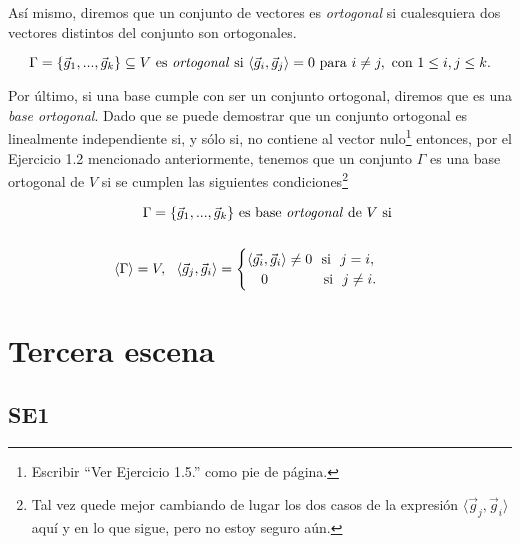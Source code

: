 \documentclass[12pt,dvipsnames]{article}
\numberwithin{equation}{section}
\begin{document}
\noindent Así mismo, diremos que un conjunto de vectores es \emph{ortogonal} si cualesquiera dos vectores distintos del conjunto son ortogonales.

\[
    \Gamma=\{\vec{g}_1,...,\vec{g}_k\}\subseteq V \ \text{es \emph{ortogonal} si} \ \langle \vec{g}_i , \vec{g}_j \rangle = 0 \ \text{para} \ i\neq j, \ \text{con} \ 1\le i,j\le k.
\]

\noindent Por último, si una base cumple con ser un conjunto ortogonal, diremos que es una \emph{base ortogonal}. Dado que se puede demostrar que un conjunto ortogonal es linealmente independiente si, y sólo si, no contiene al vector nulo\footnote{Escribir ``Ver Ejercicio 1.5.'' como pie de página.} entonces, por el Ejercicio 1.2 mencionado anteriormente, tenemos que un conjunto $\Gamma$ es una base ortogonal de $V$ si se cumplen las siguientes condiciones\footnote{Tal vez quede mejor cambiando de lugar los dos casos de la expresión $\langle \vec{g}_j , \vec{g}_i \rangle$ aquí y en lo que sigue, pero no estoy seguro aún.}

\begin{align*}
    \Gamma=\{\vec{g}_1,...,\vec{g}_k\} \text{ es base \emph{ortogonal} de } V \text{ si}& & &\\
    \\
    \langle\Gamma\rangle = V, \ \ \langle \vec{g}_j , \vec{g}_i \rangle = \begin{cases} \langle\vec{g_i}, \vec{g}_i\rangle\neq0 \ \ \text{si} \ \ j = i, \\ \quad 0 \quad \ \ \ \ \ \ \ \ \ \text{si} \ \ j\neq i. \end{cases}& & &\\
\end{align*}


\newpage
\section{Tercera escena}

\subsection*{SE1}

\end{document}
